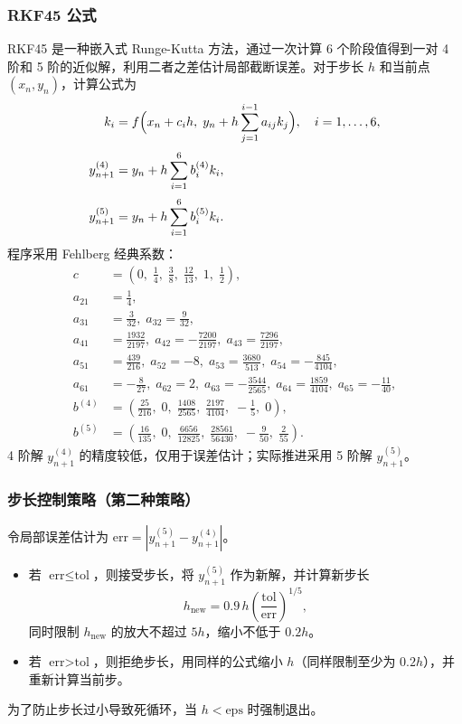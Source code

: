 \documentclass[12pt,a4paper]{article}
\begin{document}
\subsubsection{RKF45 公式}
RKF45 是一种嵌入式 Runge-Kutta 方法，通过一次计算 6 个阶段值得到一对 4 阶和 5 阶的近似解，利用二者之差估计局部截断误差。对于步长 $h$ 和当前点 $(x_n, y_n)$，计算公式为
\begin{align*}
    k_i &= f\Bigl(x_n + c_i h,\; y_n + h\sum_{j=1}^{i-1} a_{ij} k_j\Bigr), \quad i = 1,\dots,6,\\[2pt]
    y_{n+1}^{(4)} &= y_n + h\sum_{i=1}^6 b_i^{(4)} k_i,\\[2pt]
    y_{n+1}^{(5)} &= y_n + h\sum_{i=1}^6 b_i^{(5)} k_i.
\end{align*}
程序采用 Fehlberg 经典系数：
\[
\begin{aligned}
c &= (0,\;\tfrac14,\;\tfrac38,\;\tfrac{12}{13},\;1,\;\tfrac12),\\
a_{21} &= \tfrac14,\\
a_{31} &= \tfrac{3}{32},\; a_{32} = \tfrac{9}{32},\\
a_{41} &= \tfrac{1932}{2197},\; a_{42} = -\tfrac{7200}{2197},\; a_{43} = \tfrac{7296}{2197},\\
a_{51} &= \tfrac{439}{216},\; a_{52} = -8,\; a_{53} = \tfrac{3680}{513},\; a_{54} = -\tfrac{845}{4104},\\
a_{61} &= -\tfrac{8}{27},\; a_{62} = 2,\; a_{63} = -\tfrac{3544}{2565},\; a_{64} = \tfrac{1859}{4104},\; a_{65} = -\tfrac{11}{40},\\
b^{(4)} &= (\tfrac{25}{216},\;0,\;\tfrac{1408}{2565},\;\tfrac{2197}{4104},\;-\tfrac15,\;0),\\
b^{(5)} &= (\tfrac{16}{135},\;0,\;\tfrac{6656}{12825},\;\tfrac{28561}{56430},\;-\tfrac{9}{50},\;\tfrac{2}{55}).
\end{aligned}
\]
4 阶解 $y_{n+1}^{(4)}$ 的精度较低，仅用于误差估计；实际推进采用 5 阶解 $y_{n+1}^{(5)}$。

\subsubsection{步长控制策略（第二种策略）}
令局部误差估计为 $\text{err} = |y_{n+1}^{(5)} - y_{n+1}^{(4)}|$。
\begin{itemize}
    \item 若 $\text{err} \le \text{tol}$，则接受步长，将 $y_{n+1}^{(5)}$ 作为新解，并计算新步长
    \[
    h_{\text{new}} = 0.9 \, h \left( \frac{\text{tol}}{\text{err}} \right)^{\!1/5},
    \]
    同时限制 $h_{\text{new}}$ 的放大不超过 $5h$，缩小不低于 $0.2h$。
    \item 若 $\text{err} > \text{tol}$，则拒绝步长，用同样的公式缩小 $h$（同样限制至少为 $0.2h$），并重新计算当前步。
\end{itemize}
为了防止步长过小导致死循环，当 $h < \text{eps}$ 时强制退出。
\end{document}
